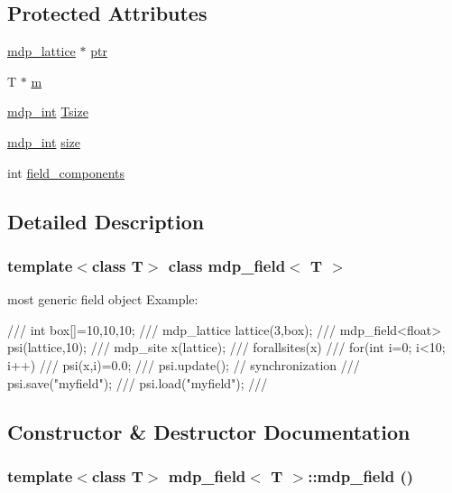 \subsection*{Protected Attributes}
\begin{DoxyCompactItemize}
\item 
\hyperlink{classmdp__lattice}{mdp\_\-lattice} $\ast$ \hyperlink{classmdp__field_aa3e7e522a6e3c47da7ff7075d71f6417}{ptr}
\item 
T $\ast$ \hyperlink{classmdp__field_a4d38ed40feef11c07d751fc276a498fc}{m}
\item 
\hyperlink{mdp__global__vars_8h_aaa1ad9d0dcd2124aa5af0120d9954174}{mdp\_\-int} \hyperlink{classmdp__field_aece7eeb6754c5e2ec9f031e352eb6f1f}{Tsize}
\item 
\hyperlink{mdp__global__vars_8h_aaa1ad9d0dcd2124aa5af0120d9954174}{mdp\_\-int} \hyperlink{classmdp__field_a3dfa0ff545bed811ad055e46020bed7f}{size}
\item 
int \hyperlink{classmdp__field_a090b0995fcfb15a9e9258b5721b685ba}{field\_\-components}
\end{DoxyCompactItemize}


\subsection{Detailed Description}
\subsubsection*{template$<$class T$>$ class mdp\_\-field$<$ T $>$}

most generic field object Example: \begin{DoxyVerb}
///    int box[]={10,10,10};
///    mdp_lattice lattice(3,box);
///    mdp_field<float> psi(lattice,10);
///    mdp_site x(lattice);
///    forallsites(x)
///      for(int i=0; i<10; i++)
///         psi(x,i)=0.0;
///    psi.update(); // synchronization
///    psi.save("myfield");
///    psi.load("myfield");
/// \end{DoxyVerb}
 

\subsection{Constructor \& Destructor Documentation}
\hypertarget{classmdp__field_ab3e16ee58db96391a255579bc89d8535}{
\subsubsection[{mdp\_\-field}]{\setlength{\rightskip}{0pt plus 5cm}template$<$class T$>$ {\bf mdp\_\-field}$<$ T $>$::{\bf mdp\_\-field} ()}}
\label{classmdp__field_ab3e16ee58db96391a255579bc89d8535}


